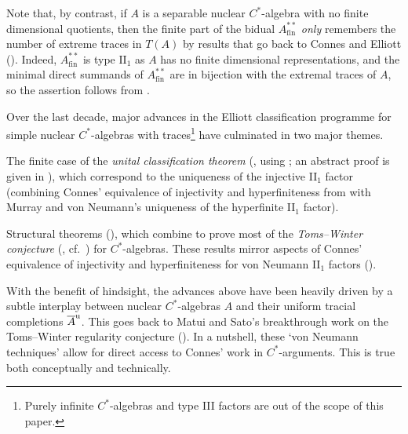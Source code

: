 \documentclass[a4paper,11pt]{amsart}
\theoremstyle{definition}
\numberwithin{equation}{section}
\numberwithin{theorem}{section}
\newcommand{\completion}[2]{\overline{#1}^{#2}}
\begin{document}
Note that, by contrast, if $A$ is a separable nuclear $C^*$-algebra with no finite dimensional quotients, then the finite part of the bidual 
$A^{**}_{\mathrm{fin}}$ \emph{only} remembers the number of extreme traces in $T(A)$ by results that go back to Connes and Elliott (\cite{Co76, El76b}).  Indeed, $A^{**}_{\mathrm{fin}}$ is type $\mathrm{II}_1$ as $A$ has no finite dimensional representations, and the minimal direct summands of $A^{**}_{\mathrm{fin}}$ are in bijection with the extremal traces of $A$, so the assertion follows from \cite[Theorem~4.3]{El76b}.
  
Over the last decade, major advances in the Elliott classification programme for simple nuclear $C^*$-algebras with traces\footnote{Purely infinite $C^*$-algebras and type III factors are out of the scope of this paper.}  have culminated in two major themes.
\begin{description}[leftmargin = \parindent, labelindent = 0 cm]
\item[Classification] The finite case of the \emph{unital classification theorem} (\cite[Corollary D]{CETWW}, using \cite{EGLN15,GLN20a,GLN20b, TWW17}; an abstract proof is given in \cite{CGSTW}), which correspond to the uniqueness of the injective II$_1$ factor (combining Connes' equivalence of injectivity and hyperfiniteness from \cite{Co76} with Murray and von Neumann's uniqueness of the hyperfinite II$_1$ factor). 
\item[Structure] Structural theorems (\cite{Wi10,Wi12,Ti14,MS12,MS14,SWW15,BBSTWW, CETWW, CE}), which combine to prove most of the \emph{Toms--Winter conjecture} (\cite[Conjecture~9.3]{WZ10}, cf.\ \cite{TW09,ET08}) for $C^*$-algebras.  These results mirror aspects of Connes' equivalence of injectivity and hyperfiniteness for von Neumann II$_1$ factors (\cite{Co76}).
\end{description}
 With the benefit of hindsight, the advances above have been heavily driven by a subtle interplay between nuclear $C^*$-algebras $A$ and their uniform tracial completions $\completion{A}{\rm u}$. This goes back to Matui and Sato's breakthrough work on the Toms--Winter regularity conjecture (\cite{MS12,MS14}).
 In a nutshell, these `von Neumann techniques' allow for direct access to Connes' work in $C^*$-arguments.  This is true both conceptually and technically.



  
\end{document}
